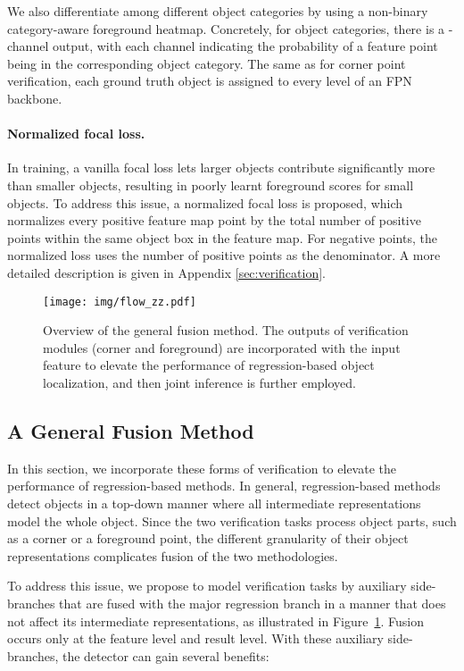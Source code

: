 \documentclass{article}
\begin{document}
We also differentiate among different object categories by using a non-binary category-aware foreground heatmap. Concretely, for  object categories, there is a -channel output, with each channel indicating the probability of a feature point being in the corresponding object category. The same as for corner point verification, each ground truth object is assigned to every level of an FPN backbone.

\paragraph{Normalized focal loss.} In training, a vanilla focal loss lets larger objects contribute significantly more than smaller objects, resulting in poorly learnt foreground scores for small objects. To address this issue, a normalized focal loss is proposed, which normalizes every positive feature map point by the total number of positive points within the same object box in the feature map. For negative points, the normalized loss uses the number of positive points as the denominator. A more detailed description is given in Appendix \ref{sec:verification}.

\begin{figure}
    \centering
    \texttt{[image: img/flow\_zz.pdf]}
    \caption{Overview of the general fusion method. The outputs of verification modules (corner and foreground) are incorporated with the input feature to elevate the performance of regression-based object localization, and then joint inference is further employed.}
    \label{fig:flow1}
    \vspace{-1em}
\end{figure}

\subsection{A General Fusion Method} \label{sec:fusion}

In this section, we incorporate these forms of verification to elevate the performance of regression-based methods. In general, regression-based methods detect objects in a top-down manner where all intermediate representations model the whole object. Since the two verification tasks process object parts, such as a corner or a foreground point, the different granularity of their object representations complicates fusion of the two methodologies.

To address this issue, we propose to model verification tasks by auxiliary side-branches that are fused with the major regression branch in a manner that does not affect its intermediate representations, as illustrated in Figure~\ref{fig:flow1}. Fusion occurs only at the feature level and result level. With these auxiliary side-branches, the detector can gain several benefits:
\end{document}
